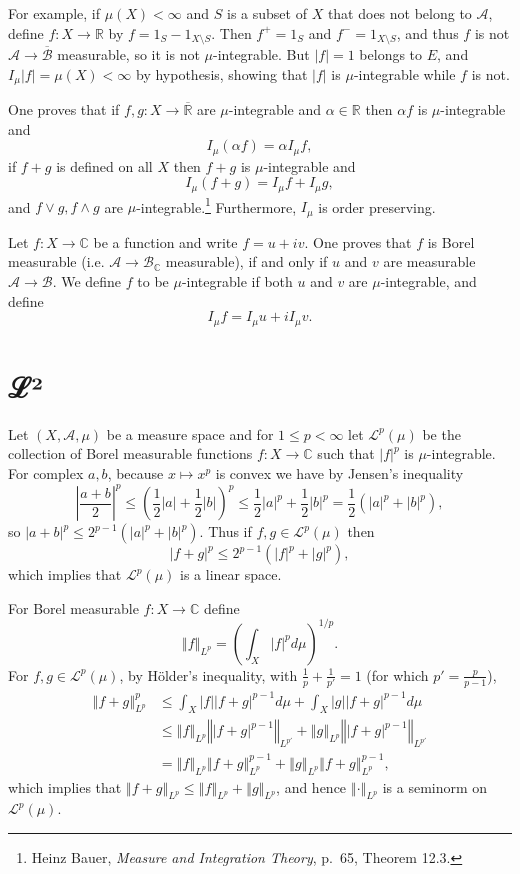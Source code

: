 \documentclass{article}
\newcommand{\norm}[1]{\left\Vert #1 \right\Vert}
\theoremstyle{definition}
\begin{document}
For example, if  $\mu(X)<\infty$ and   $S$ is a subset of $X$ that does not belong to $\mathscr{A}$, define $f:X \to \mathbb{R}$
by $f = 1_S - 1_{X \setminus S}$. Then  $f^+=1_S$ and $f^-=1_{X \setminus S}$, and thus $f$ is not $\mathscr{A} \to \overline{\mathscr{B}}$
measurable, so it is not $\mu$-integrable. But $|f|=1$ belongs to $E$, and $I_\mu |f| = \mu(X)<\infty$ by hypothesis, showing
that $|f|$ is $\mu$-integrable while $f$ is not. 

One proves that if $f,g:X \to \overline{\mathbb{R}}$ are $\mu$-integrable and $\alpha \in \mathbb{R}$ then 
$\alpha f$ is $\mu$-integrable and
\[
I_\mu (\alpha f) = \alpha I_\mu f,
\]
if $f+g$ is defined on all $X$ then $f+g$ is $\mu$-integrable and 
\[
I_\mu(f+g) = I_\mu f+ I_\mu g,
\]
and $f \vee g, f \wedge g$ are $\mu$-integrable.\footnote{Heinz Bauer,
{\em Measure and Integration Theory}, p.~65, Theorem 12.3.}
Furthermore, $I_\mu$ is order preserving.

Let $f:X \to \mathbb{C}$ be a function and write $f=u+iv$. One proves that $f$ is Borel measurable (i.e.
$\mathscr{A} \to \mathscr{B}_\mathbb{C}$ measurable), if and only if $u$ and $v$ are measurable $\mathscr{A} \to \mathscr{B}$. 
We define $f$ to be $\mu$-integrable if both $u$ and $v$ are $\mu$-integrable, and define 
\[
I_\mu f = I_\mu u + i I_\mu v.
\]







\section{ℒ²}
Let $(X,\mathscr{A},\mu)$ be a measure space and
for $1 \leq p < \infty$ let $\mathscr{L}^p(\mu)$ be the collection
of Borel measurable functions $f:X \to \mathbb{C}$ such that $|f|^p$ is $\mu$-integrable. 
For  complex $a,b$, because
$x \mapsto x^p$ is convex we have by Jensen's inequality
\[
\left| \frac{a+b}{2} \right|^p \leq \left( \frac{1}{2}|a| + \frac{1}{2}|b| \right)^p
\leq \frac{1}{2} |a|^p + \frac{1}{2}|b|^p=\frac{1}{2}(|a|^p+|b|^p),
\]
so $|a+b|^p \leq 2^{p-1} (|a|^p+|b|^p)$. Thus if $f,g \in \mathscr{L}^p(\mu)$ then
\[
|f+g|^p \leq 2^{p-1}(|f|^p+|g|^p),
\]
 which implies that $\mathscr{L}^p(\mu)$ is a linear space. 

For Borel measurable $f:X \to \mathbb{C}$ define
\[
\norm{f}_{L^p} = \left( \int_X |f|^p d\mu \right)^{1/p}.
\]
For $f,g \in \mathscr{L}^p(\mu)$, by H\"older's inequality, with $\frac{1}{p}+\frac{1}{p'}=1$ (for which $p'=\frac{p}{p-1}$),
\begin{align*}
\norm{f+g}_{L^p}^p& \leq \int_X |f| |f+g|^{p-1} d\mu
+\int_X |g| |f+g|^{p-1} d\mu\\
&\leq \norm{f}_{L^p} \norm{|f+g|^{p-1}}_{L^{p'}} + \norm{g}_{L^p} \norm{|f+g|^{p-1}}_{L^{p'}}\\
&= \norm{f}_{L^p} \norm{f+g}_{L^p}^{p-1} + \norm{g}_{L^p} \norm{f+g}_{L^p}^{p-1},
\end{align*}
which implies that $\norm{f+g}_{L^p} \leq \norm{f}_{L^p} + \norm{g}_{L^p}$, and hence $\norm{\cdot}_{L^p}$ is
a seminorm on $\mathscr{L}^p(\mu)$. 
\end{document}
